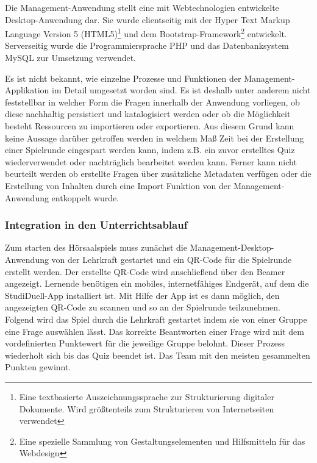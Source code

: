 \documentclass[conference]{IEEEtran}
\begin{document}
Die Management-Anwendung stellt eine mit Webtechnologien entwickelte Desktop-Anwendung dar. Sie wurde clientseitig mit der Hyper Text Markup Language Version 5 (HTML5)\footnote{Eine textbasierte Auszeichnungssprache zur Strukturierung digitaler Dokumente. Wird größtenteils zum Strukturieren von Internetseiten verwendet} und dem Bootstrap-Framework\footnote{Eine spezielle Sammlung von Gestaltungselementen und Hilfsmitteln für das Webdesign} entwickelt. Serverseitig wurde die Programmiersprache PHP und das Datenbanksystem MySQL zur Umsetzung verwendet. \cite[S. 342]{Hobert2017}

Es ist nicht bekannt, wie einzelne Prozesse und Funktionen der Management-Applikation im Detail umgesetzt worden sind. Es ist deshalb unter anderem nicht feststellbar in welcher Form die Fragen innerhalb der Anwendung vorliegen, ob diese nachhaltig persistiert und katalogisiert werden oder ob die Möglichkeit besteht Ressourcen zu importieren oder exportieren. Aus diesem Grund kann keine Aussage darüber getroffen werden in welchem Maß Zeit bei der Erstellung einer Spielrunde eingespart werden kann, indem z.B. ein zuvor erstelltes Quiz wiederverwendet oder nachträglich bearbeitet werden kann. Ferner kann nicht beurteilt werden ob erstellte Fragen über zusätzliche Metadaten verfügen oder die Erstellung von Inhalten durch eine Import Funktion von der Management-Anwendung entkoppelt wurde. 
\\
\subsubsection{Integration in den Unterrichtsablauf}
Zum starten des Hörsaalspiels muss zunächst die Management-Desktop-Anwendung von der Lehrkraft gestartet und ein QR-Code für die Spielrunde erstellt werden. Der erstellte QR-Code wird anschließend über den Beamer angezeigt. Lernende benötigen ein mobiles, internetfähiges Endgerät, auf dem die StudiDuell-App installiert ist. Mit Hilfe der App ist es dann möglich, den angezeigten QR-Code zu scannen und so an der Spielrunde teilzunehmen. Folgend wird das Spiel durch die Lehrkraft gestartet indem sie von einer Gruppe eine Frage auswählen lässt. Das korrekte Beantworten einer Frage wird mit dem vordefinierten Punktewert für die jeweilige Gruppe belohnt. Dieser Prozess wiederholt sich bis das Quiz beendet ist. Das Team mit den meisten gesammelten Punkten gewinnt. \cite[S. 340f]{Hobert2017}
\\
\end{document}

